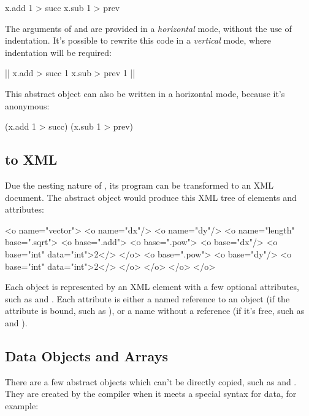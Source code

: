 \begin{ffcode}
[x]
  x.add 1 > succ
  x.sub 1 > prev
\end{ffcode}

The arguments of  and  are provided in a \emph{horizontal}
mode, without the use of indentation. It's possible to rewrite this code
in a \emph{vertical} mode, where indentation will be required:

\begin{ffcode}
[x] |$\label{ln:succ}$|
  x.add > succ
    1
  x.sub > prev
    1 |$\label{ln:succ-end}$|
\end{ffcode}

This abstract object can also be written in a horizontal mode,
because it's anonymous:

\begin{ffcode}
[x] (x.add 1 > succ) (x.sub 1 > prev)
\end{ffcode}

\subsection{\eo{} to XML}\label{sec:xml}

Due the nesting nature of \eo{}, its program can be transformed
to an XML document. The abstract object  would produce
this XML tree of elements and attributes:

\begin{ffcode}
<o name="vector">
  <o name="dx"/>
  <o name="dy"/>
  <o name="length" base=".sqrt">
    <o base=".add">
      <o base=".pow">
        <o base="dx"/>
        <o base="int" data="int">2</>
      </o>
      <o base=".pow">
        <o base="dy"/>
        <o base="int" data="int">2</>
      </o>
    </o>
  </o>
</o>
\end{ffcode}

Each object is represented by an  XML element with a few
optional attributes, such as  and . Each
attribute is either a named reference to an object (if the attribute is bound,
such as ), or a name without a reference (if it's free,
such as  and ).

\subsection{Data Objects and Arrays}

There are a few abstract objects which can't be directly copied, such as
 and . They are created by the compiler when it meets
a special syntax for data, for example:


